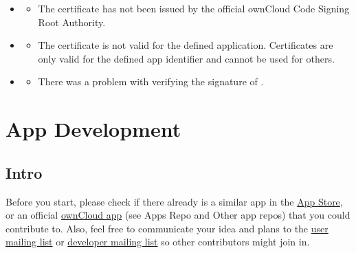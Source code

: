 \documentclass[letterpaper,10pt,english]{sphinxmanual}
\begin{document}
\begin{itemize}
\begin{itemize}
\begin{itemize}
\begin{itemize}
\end{itemize}

\item {} 
\begin{itemize}
\item {} 
The certificate has not been issued by the official ownCloud Code
Signing Root Authority.

\end{itemize}

\item {} 
\begin{itemize}
\item {} 
The certificate is not valid for the defined application. Certificates
are only valid for the defined app identifier and cannot be used for
others.

\end{itemize}

\item {} 
\begin{itemize}
\item {} 
There was a problem with verifying the signature of .

\end{itemize}

\end{itemize}

\end{itemize}

\end{itemize}


\section{App Development}
\label{app/index:app-development}

\subsection{Intro}
\label{app/index:intro}
Before you start, please check if there already is a similar app in the \href{https://apps.owncloud.com}{App Store}, or an official \href{https://github.com/owncloud/core/wiki/Maintainers\#apps-repo}{ownCloud app} (see Apps Repo and Other app repos) that you could contribute to. Also, feel free to communicate your idea and plans to the \href{https://mailman.owncloud.org/mailman/listinfo/user}{user mailing list} or \href{https://mailman.owncloud.org/mailman/listinfo/devel}{developer mailing list} so other contributors might join in.
\end{document}
